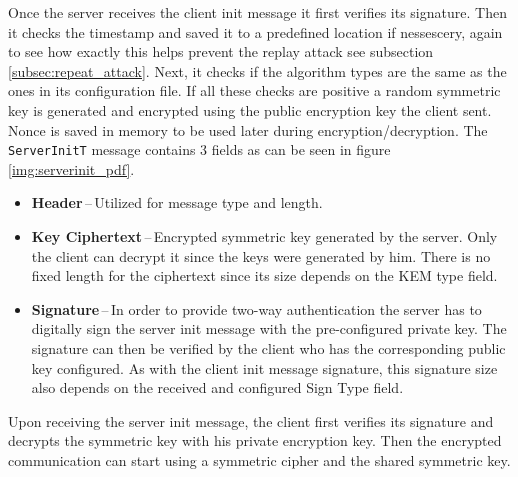 Once the server receives the client init message it first verifies its signature. Then it checks the timestamp and saved it to a predefined location if nessescery, again to see how exactly this helps prevent the replay attack see subsection \ref{subsec:repeat_attack}. Next, it checks if the algorithm types are the same as the ones in its configuration file. If all these checks are positive a random symmetric key is generated and encrypted using the public encryption key the client sent. Nonce is saved in memory to be used later during encryption/decryption. The \texttt{ServerInitT} message contains 3 fields as can be seen in figure \ref{img:serverinit_pdf}.
\begin{itemize}
  \item \textbf{Header}\,--\,Utilized for message type and length.
  \item \textbf{Key Ciphertext}\,--\,Encrypted symmetric key generated by the server. Only the client can decrypt it since the keys were generated by him. There is no fixed length for the ciphertext since its size depends on the KEM type field.
  \item \textbf{Signature}\,--\,In order to provide two-way authentication the server has to digitally sign the server init message with the pre-configured private key. The signature can then be verified by the client who has the corresponding public key configured. As with the client init message signature, this signature size also depends on the received and configured Sign Type field.
\end{itemize}

Upon receiving the server init message, the client first verifies its signature and decrypts the symmetric key with his private encryption key. Then the encrypted communication can start using a symmetric cipher and the shared symmetric key.
